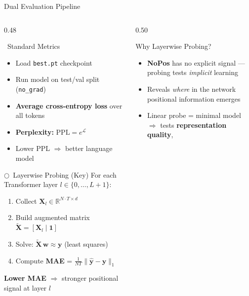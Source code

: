 \documentclass[aspectratio=169, 10pt]{beamer}
\newcommand{\faChartBar}{\ding{111}\ }
\newcommand{\faMicroscope}{$\bigcirc$\ }
\begin{document}
\begin{frame}{Dual Evaluation Pipeline}
  \begin{columns}[T]
    \begin{column}{0.48\textwidth}
      \begin{block}{\faChartBar Standard Metrics}
        \begin{itemize}
          \item Load \texttt{best.pt} checkpoint
          \item Run model on test/val split (\texttt{no\_grad})
          \item \textbf{Average cross-entropy loss} over all tokens
          \item \textbf{Perplexity:} $\text{PPL} = e^{\mathcal{L}}$
          \item Lower PPL $\Rightarrow$ better language model
        \end{itemize}
      \end{block}
      \vspace{0.4em}
      \begin{alertblock}{\faMicroscope Layerwise Probing (Key)}
        For each Transformer layer $l \in \{0, \ldots, L+1\}$:
        \begin{enumerate}
          \item Collect $\mathbf{X}_l \in \mathbb{R}^{N\cdot T \times d}$
          \item Build augmented matrix $\tilde{\mathbf{X}} = [\mathbf{X}_l \mid \mathbf{1}]$
          \item Solve: $\tilde{\mathbf{X}}\,\mathbf{w} \approx \mathbf{y}$ (least squares)
          \item Compute \textbf{MAE} = $\frac{1}{NT}\|\hat{\mathbf{y}} - \mathbf{y}\|_1$
        \end{enumerate}
        \textbf{Lower MAE} $\Rightarrow$ stronger positional signal at layer $l$
      \end{alertblock}
    \end{column}
    \begin{column}{0.50\textwidth}
      \begin{block}{Why Layerwise Probing?}
        \begin{itemize}
          \item \textbf{NoPos} has no explicit signal — probing tests \textit{implicit} learning
          \item Reveals \textit{where} in the network positional information emerges
          \item Linear probe = minimal model $\Rightarrow$ tests \textbf{representation quality},

\end{itemize}
\end{block}
\end{column}
\end{columns}
\end{frame}
\end{document}
